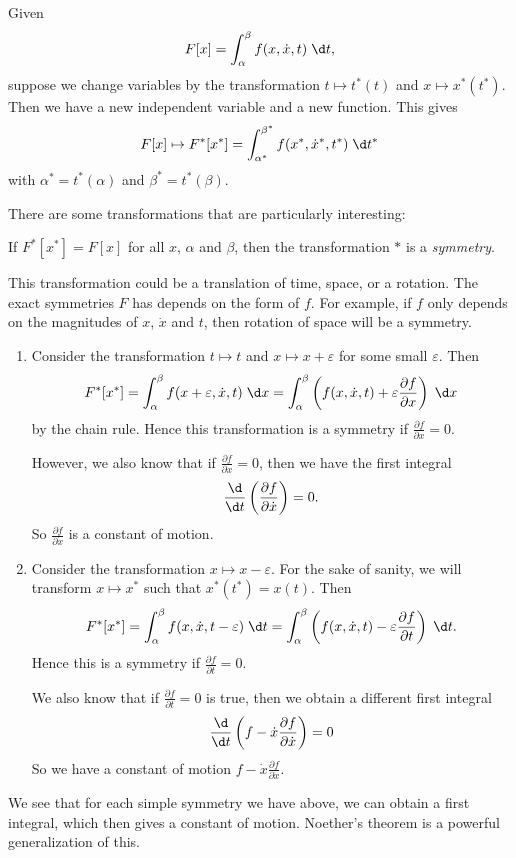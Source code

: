 \documentclass[a4paper]{article}
\begin{document}
Given
\[
  F[x]= \int_\alpha^\beta f(x, \dot{x}, t)\;\d t,
\]
suppose we change variables by the transformation $t \mapsto t^*(t)$ and $x\mapsto x^*(t^*)$. Then we have a new independent variable and a new function. This gives
\[
  F[x] \mapsto F^* [x^*] = \int_{\alpha^*}^{\beta^*} f(x^*, \dot{x}^*, t^*)\;\d t^*
\]
with $\alpha^* = t^*(\alpha)$ and $\beta^* = t^*(\beta)$.

There are some transformations that are particularly interesting:
\begin{defi}[Symmetry]
  If $F^*[x^*] = F[x]$ for all $x$, $\alpha$ and $\beta$, then the transformation $*$ is a \emph{symmetry}.
\end{defi}

This transformation could be a translation of time, space, or a rotation. The exact symmetries $F$ has depends on the form of $f$. For example, if $f$ only depends on the magnitudes of $x$, $\dot{x}$ and $t$, then rotation of space will be a symmetry.

\begin{eg}\leavevmode
  \begin{enumerate}
    \item Consider the transformation $t \mapsto t$ and $x \mapsto x + \varepsilon$ for some small $\varepsilon$. Then
      \[
        F^*[x^*] = \int_\alpha^\beta f(x + \varepsilon, \dot{x}, t)\;\d x = \int_\alpha^\beta \left(f(x, \dot{x}, t) + \varepsilon \frac{\partial f}{\partial x}\right)\;\d x
      \]
      by the chain rule. Hence this transformation is a symmetry if $\frac{\partial f}{\partial x} = 0$.

      However, we also know that if $\frac{\partial f}{\partial x} = 0$, then we have the first integral
      \[
        \frac{\d}{\d t}\left(\frac{\partial f}{\partial \dot{x}}\right) = 0.
      \]
      So $\frac{\partial f}{\partial \dot{x}}$ is a constant of motion.
    \item Consider the transformation $x \mapsto x - \varepsilon$. For the sake of sanity, we will transform $x\mapsto x^*$ such that $x^*(t^*) = x(t)$. Then
      \[
        F^*[x^*] = \int_\alpha^\beta f(x, \dot{x}, t - \varepsilon)\;\d t = \int_\alpha^\beta \left(f(x, \dot{x}, t) - \varepsilon \frac{\partial f}{\partial t}\right)\;\d t.
      \]
      Hence this is a symmetry if $\frac{\partial f}{\partial t} = 0$.

      We also know that if $\frac{\partial f}{\partial t} = 0$ is true, then we obtain a different first integral
      \[
        \frac{\d}{\d t}\left(f - \dot{x}\frac{\partial f}{\partial \dot{x}}\right) = 0
      \]
      So we have a constant of motion $f - \dot{x}\frac{\partial f}{\partial \dot{x}}$.
  \end{enumerate}
\end{eg}
We see that for each simple symmetry we have above, we can obtain a first integral, which then gives a constant of motion. Noether's theorem is a powerful generalization of this.
\end{document}
